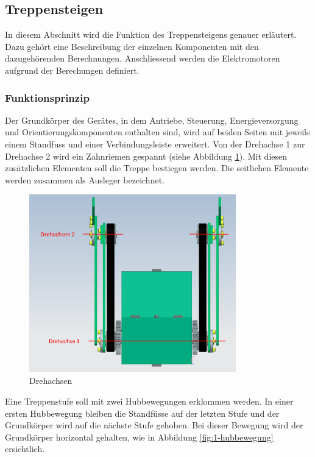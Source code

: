 \subsection{Treppensteigen}
In diesem Abschnitt wird die Funktion des Treppensteigens genauer erläutert. Dazu gehört eine Beschreibung der einzelnen Komponenten mit den dazugehörenden Berechnungen. Anschliessend werden die Elektromotoren aufgrund der Berechungen definiert. 
\subsubsection{Funktionsprinzip}
Der Grundkörper des Gerätes, in dem Antriebe, Steuerung, Energieversorgung und Orientierungskomponenten enthalten sind, wird auf beiden Seiten mit jeweils einem Standfuss und einer Verbindungsleiste erweitert. Von der Drehachse 1 zur Drehachse 2 wird ein Zahnriemen gespannt (siehe Abbildung \ref{fig:skizze-drehachse-final}). Mit diesen zusätzlichen Elementen soll die Treppe bestiegen werden. Die seitlichen Elemente werden zusammen als Ausleger bezeichnet.

\begin{figure}[H]
  \includegraphics[width=0.8\textwidth]{img/Treppensteigen/Skizze Drehachsen final.PNG}
  \centering
  \caption{Drehachsen}
  \label{fig:skizze-drehachse-final}
\end{figure}

\newpage

Eine Treppenstufe soll mit zwei Hubbewegungen erklommen werden. In einer ersten Hubbewegung bleiben die Standfüsse auf der letzten Stufe und der Grundkörper wird auf die nächste Stufe gehoben. Bei dieser Bewegung wird der Grundkörper horizontal gehalten, wie in Abbildung \ref{fig:1-hubbewegung} ersichtlich.


